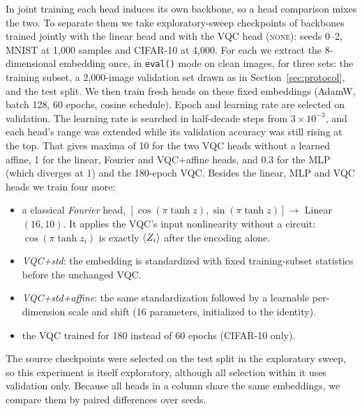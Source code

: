 \documentclass[10pt]{article}
\begin{document}
In joint training each head induces its own backbone, so a head comparison
mixes the two. To separate them we take exploratory-sweep checkpoints of
backbones trained jointly with the linear head and with the VQC head
(\textsc{none}): seeds 0--2, MNIST at 1{,}000 samples and CIFAR-10 at
4{,}000. For each we extract the 8-dimensional embedding once, in
\texttt{eval()} mode on clean images, for three sets: the training subset, a
2{,}000-image validation set drawn as in Section~\ref{sec:protocol}, and the
test split. We then train fresh heads on these fixed embeddings (AdamW, batch
128, 60 epochs, cosine schedule). Epoch and learning rate are selected on
validation. The learning rate is searched in half-decade steps from
$3\times10^{-3}$, and each head's range was extended while its validation
accuracy was still rising at the top. That gives maxima of 10 for the two VQC
heads without a learned affine, 1 for the linear, Fourier and VQC+affine heads,
and 0.3 for the MLP (which diverges at 1) and the 180-epoch VQC. Besides the
linear, MLP and VQC heads we train four more:
\begin{itemize}
  \item a classical \emph{Fourier} head, $[\cos(\pi\tanh z), \sin(\pi\tanh z)]
        \to$ Linear$(16,10)$. It applies the VQC's input nonlinearity without a
        circuit: $\cos(\pi\tanh z_i)$ is exactly $\braket{Z_i}$ after the
        encoding alone.
  \item \emph{VQC+std}: the embedding is standardized with fixed
        training-subset statistics before the unchanged VQC.
  \item \emph{VQC+std+affine}: the same standardization followed by a
        learnable per-dimension scale and shift (16 parameters, initialized
        to the identity).
  \item the VQC trained for 180 instead of 60 epochs (CIFAR-10 only).
\end{itemize}
The source checkpoints were selected on the test split in the exploratory
sweep, so this experiment is itself exploratory, although all selection
within it uses validation only. Because all heads in a column share the same
embeddings, we compare them by paired differences over seeds.
\end{document}
